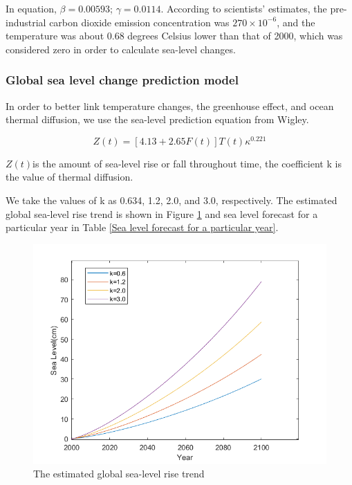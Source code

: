 \documentclass[12pt]{article}  %
\begin{document}
In equation, $\beta=0.00593$; $\gamma =0.0114$. According to scientists' estimates, the pre-industrial carbon dioxide emission concentration was $270\times10^{-6}$, and the temperature was about 0.68 degrees Celsius lower than that of 2000, which was considered zero in order to calculate sea-level changes.




\subsubsection{Global sea level change prediction model}
In order to better link temperature changes, the greenhouse effect, and ocean thermal diffusion, we use the sea-level prediction equation from Wigley.

\begin{equation}
    Z\left( t \right) =\left[ 4.13+2.65F\left( t \right) \right] T\left( t \right) \kappa ^{0.221}
\end{equation}








$Z(t)$is the amount of sea-level rise or fall throughout time, the coefficient k is the value of thermal diffusion.

We take the values of k as 0.634, 1.2, 2.0, and 3.0, respectively. The estimated global sea-level rise trend is shown in Figure \ref{2000_2100} and sea level forecast for a particular year in Table \ref{Sea level forecast for a particular year}.



\begin{figure}[htbp]\label{2000_2100}
	\centering
	\includegraphics[width=.6\textwidth]{2000_2100.png}
	\caption{ The  estimated  global sea-level rise trend}\label{2000_2100}
\end{figure}
\end{document}
